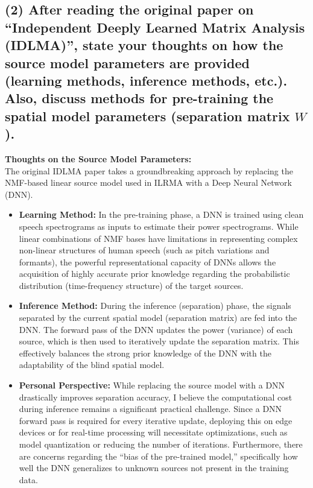 \documentclass[12pt,a4paper]{article}
\begin{document}
\subsection*{(2) After reading the original paper on ``Independent Deeply Learned Matrix Analysis (IDLMA)'', state your thoughts on how the source model parameters are provided (learning methods, inference methods, etc.). Also, discuss methods for pre-training the spatial model parameters (separation matrix $W$).}

\textbf{Thoughts on the Source Model Parameters:} \\
The original IDLMA paper takes a groundbreaking approach by replacing the NMF-based linear source model used in ILRMA with a Deep Neural Network (DNN).
\begin{itemize}
    \item \textbf{Learning Method:} In the pre-training phase, a DNN is trained using clean speech spectrograms as inputs to estimate their power spectrograms. While linear combinations of NMF bases have limitations in representing complex non-linear structures of human speech (such as pitch variations and formants), the powerful representational capacity of DNNs allows the acquisition of highly accurate prior knowledge regarding the probabilistic distribution (time-frequency structure) of the target sources.
    \item \textbf{Inference Method:} During the inference (separation) phase, the signals separated by the current spatial model (separation matrix) are fed into the DNN. The forward pass of the DNN updates the power (variance) of each source, which is then used to iteratively update the separation matrix. This effectively balances the strong prior knowledge of the DNN with the adaptability of the blind spatial model.
    \item \textbf{Personal Perspective:} While replacing the source model with a DNN drastically improves separation accuracy, I believe the computational cost during inference remains a significant practical challenge. Since a DNN forward pass is required for every iterative update, deploying this on edge devices or for real-time processing will necessitate optimizations, such as model quantization or reducing the number of iterations. Furthermore, there are concerns regarding the ``bias of the pre-trained model,'' specifically how well the DNN generalizes to unknown sources not present in the training data.
\end{itemize}
\end{document}
